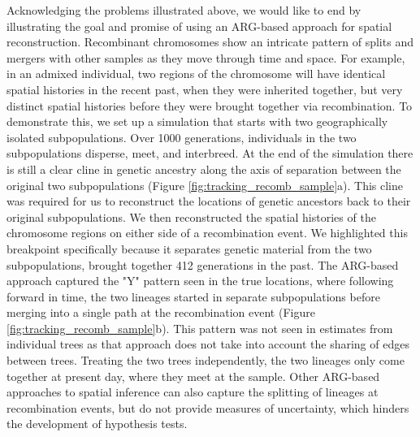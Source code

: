 Acknowledging the problems illustrated above, we would like to end by illustrating the goal and promise of using an ARG-based approach for spatial reconstruction. Recombinant chromosomes show an intricate pattern of splits and mergers with other samples as they move through time and space. For example, in an admixed individual, two regions of the chromosome will have identical spatial histories in the recent past, when they were inherited together, but very distinct spatial histories before they were brought together via recombination. To demonstrate this, we set up a simulation that starts with two geographically isolated subpopulations. Over 1000 generations, individuals in the two subpopulations disperse, meet, and interbreed. At the end of the simulation there is still a clear cline in genetic ancestry along the axis of separation between the original two subpopulations (Figure \ref{fig:tracking_recomb_sample}a). This cline was required for us to reconstruct the locations of genetic ancestors back to their original subpopulations. We then reconstructed the spatial histories of the chromosome regions on either side of a recombination event. We highlighted this breakpoint specifically because it separates genetic material from the two subpopulations, brought together 412 generations in the past. The ARG-based approach captured the "Y" pattern seen in the true locations, where following forward in time, the two lineages started in separate subpopulations before merging into a single path at the recombination event (Figure \ref{fig:tracking_recomb_sample}b). This pattern was not seen in estimates from individual trees as that approach does not take into account the sharing of edges between trees. Treating the two trees independently, the two lineages only come together at present day, where they meet at the sample.
Other ARG-based approaches to spatial inference \citep{Wohns2022,grundler2024} can also capture the splitting of lineages at recombination events, but do not provide measures of uncertainty, which hinders the development of hypothesis tests.




